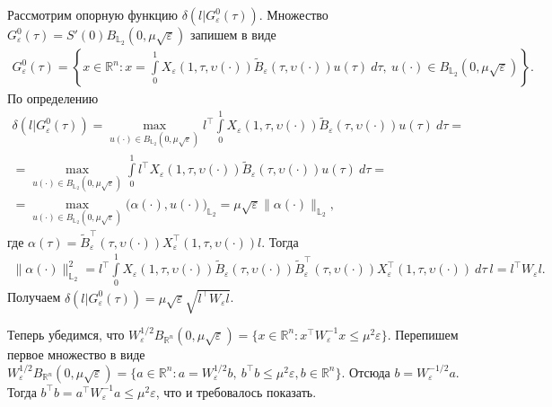 \documentclass[../main.tex]{subfiles}
\begin{document}
Рассмотрим опорную функцию $\delta(l | G^0_{\varepsilon}(\tau))$. 
Множество $G^0_{\varepsilon}(\tau) = S'(0) B_{\mathbb{L}_2}(0,\mu\sqrt{\varepsilon})$ запишем в виде 
\begin{gather*}
	G^0_{\varepsilon}(\tau) = \left\{ x \in \mathbb{R}^n: x = \int\limits_0^1 X_{\varepsilon}(1, \tau, \upsilon(\cdot)) \widetilde{B}_{\varepsilon}(\tau, \upsilon(\cdot)) u(\tau)\ d\tau, \ u(\cdot) \in B_{\mathbb{L}_2}(0,\mu\sqrt{\varepsilon}) \right\}.
\end{gather*} 
По определению
\begin{gather*}
	\delta(l | G^0_{\varepsilon}(\tau)) = \max\limits_{u(\cdot) \in B_{\mathbb{L}_2}(0,\mu\sqrt{\varepsilon})} l^{\top} \int\limits_0^1 X_{\varepsilon}(1, \tau, \upsilon(\cdot)) \widetilde{B}_{\varepsilon}(\tau, \upsilon(\cdot)) u(\tau)\ d\tau = \\ =
	\max\limits_{u(\cdot) \in B_{\mathbb{L}_2}(0,\mu\sqrt{\varepsilon})} \int\limits_0^1 l^{\top} X_{\varepsilon}(1, \tau, \upsilon(\cdot)) \widetilde{B}_{\varepsilon}(\tau, \upsilon(\cdot)) u(\tau)\ d\tau =\\=
	 \max\limits_{u(\cdot) \in B_{\mathbb{L}_2}(0,\mu\sqrt{\varepsilon})} \Big(\alpha(\cdot), u(\cdot)\Big)_{\mathbb{L}_2} =
	 \mu\sqrt{\varepsilon} \| \alpha(\cdot)\|_{\mathbb{L}_2},
\end{gather*}
где $ \alpha(\tau) = \widetilde{B}^{\top}_{\varepsilon}(\tau, \upsilon(\cdot)) X^{\top}_{\varepsilon}(1, \tau, \upsilon(\cdot)) l$. 
Тогда
\begin{gather*}
	\| \alpha(\cdot)\|^2_{\mathbb{L}_2} = l^{\top} \int\limits_0^1 X_{\varepsilon}(1, \tau, \upsilon(\cdot)) \widetilde{B}_{\varepsilon}(\tau, \upsilon(\cdot)) \widetilde{B}^{\top}_{\varepsilon}(\tau, \upsilon(\cdot)) X^{\top}_{\varepsilon}(1, \tau, \upsilon(\cdot)) \ d\tau \ l = l^{\top} W_{\varepsilon} l.
\end{gather*}
Получаем $\delta(l | G^0_{\varepsilon}(\tau)) = \mu\sqrt{\varepsilon} \sqrt{l^{\top} W_{\varepsilon} l} $.

Теперь убедимся, что $W^{1/2}_{\varepsilon} B_{\mathbb{R}^n}(0,\mu\sqrt{\varepsilon}) = \{ x \in \mathbb{R}^n: x^{\top} W^{-1}_{\varepsilon} x \leqslant \mu^2 \varepsilon \} $.
Перепишем первое множество в виде $ W^{1/2}_{\varepsilon} B_{\mathbb{R}^n}(0,\mu\sqrt{\varepsilon}) = \{ a \in \mathbb{R}^n: a = W^{1/2}_{\varepsilon} b, \ b^{\top} b \leqslant \mu^2 \varepsilon, b \in \mathbb{R}^n \} $. 
Отсюда $b = W^{-1/2}_{\varepsilon} a $.
Тогда $ b^{\top} b = a^{\top} W^{-1}_{\varepsilon} a \leqslant \mu^2 \varepsilon $, что и требовалось показать.
\end{document}
